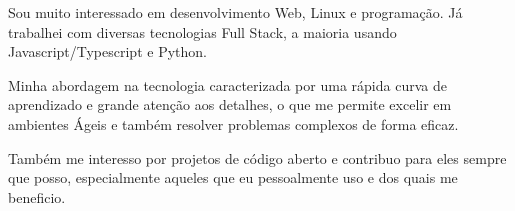 

\begin{cvparagraph}

Sou muito interessado em desenvolvimento Web, Linux e programação. Já trabalhei com diversas tecnologias Full Stack, a maioria usando Javascript/Typescript e Python.

\end{cvparagraph}

\begin{cvparagraph}
Minha abordagem na tecnologia caracterizada por uma rápida curva de aprendizado e grande atenção aos detalhes, o que me permite excelir em ambientes Ágeis e também resolver problemas complexos de forma eficaz. 
\end{cvparagraph}

\begin{cvparagraph}

Também me interesso por projetos de código aberto e contribuo para eles sempre que posso, especialmente aqueles que eu pessoalmente uso e dos quais me beneficio.

\end{cvparagraph}